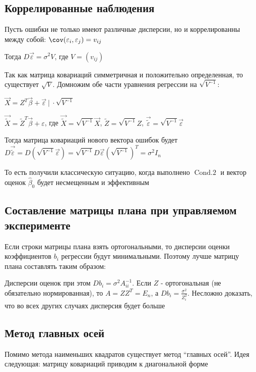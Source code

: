 \subsection{Коррелированные наблюдения}

Пусть ошибки не только имеют различные дисперсии, но и коррелированны между собой: $\cov (\varepsilon_i, \varepsilon_j) = v_{ij}$

Тогда $D \vec \varepsilon = \sigma^2 V$, где $V = \left(v_{ij}\right)$

Так как матрица ковариаций симметричная и положительно определенная, то существует $\sqrt{V}$. Домножим обе части уравнения регрессии на $\sqrt{V^{-1}}$:

$\vec X = Z^T \vec{\beta} + \vec \varepsilon \ \Big| \ \cdot \sqrt{V^{-1}}$

$\vec \tilde{X} = \tilde Z^T \vec \beta + \varepsilon$, где $\vec \tilde{X} = \sqrt{V^{-1}} \vec X$, $\tilde Z = \sqrt{V^{-1}} Z$, $\vec \tilde{\varepsilon} = \sqrt{V^{-1}} \vec \varepsilon$

Тогда матрица ковариаций нового вектора ошибок будет $D \vec \tilde{\varepsilon} = D(\sqrt{V^{-1}} \vec \varepsilon) = \sqrt{V^{-1}} D \vec \varepsilon \left(\sqrt{V^{-1}}\right)^T = \sigma^2 I_n$

То есть получили классическую ситуацию, когда выполнено $\operatorname{Cond. 2}$ и вектор оценок $\hat \beta_0$ будет несмещенным и эффективным

\subsection{Составление матрицы плана при управляемом эксперименте}

Если строки матрицы плана взять ортогональными, то дисперсии оценки коэффициентов $b_i$ регрессии будут минимальными. Поэтому лучше матрицу плана составлять таким образом:

Дисперсии оценок при этом $D b_i = \sigma^2 A^{-1}_{ii}$. Если $Z$ - ортогональная (не обязательно нормированная), то $A = Z Z^T = E_n$, а $D b_i = \frac{\sigma^2}{Z_i^2}$. Несложно доказать, что во всех других случаях дисперсия будет больше

\subsection{Метод главных осей}

Помимо метода наименьших квадратов существует метод \enquote{главных осей}. Идея следующая: матрицу ковариаций приводим к диагональной форме

